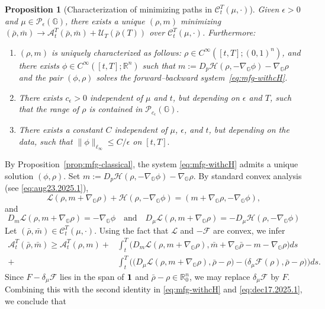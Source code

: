 \documentclass[10pt]{article}
\newtheorem{proposition}[theorem]{Proposition}
\numberwithin{equation}{section}
\newcommand{\cA}{ \mathcal{A}}
\newcommand{\cC}{ \mathcal{C}}
\newcommand{\cF}{ \mathcal{F}}
\newcommand{\cH}{ \mathcal{H}}
\newcommand{\cL}{ \mathcal{L}}
\newcommand{\cP}{ \mathcal{P}}
\newcommand{\cU}{ \mathcal{U}}
\newcommand{\bG}{\mathbb G}
\newcommand{\bR}{\mathbb R}
\newcommand{\R}{\mathbb R}
\def\R{{\mathbb{R}}}
\def\cH{\mathcal{H}}
\def\cL{\mathcal{L}}
\def\G{\mathbb{G}}
\begin{document}
%
%
\begin{proposition}[Characterization of minimizing paths in $\cC_t^T(\mu, \cdot)$]\label{prop:sufficient-min} Given $\epsilon>0$ and $\mu \in \cP_\epsilon(\G)$, there exists a unique $(\rho, m)$ minimizing $(\bar \rho, \bar m) \to \cA_t^T(\bar \rho, \bar m)+\cU_T(\bar \rho(T))$ over $\cC_t^T(\mu, \cdot)$. Furthermore:
\begin{enumerate}
\item[(i)] $(\rho, m)$ is uniquely characterized as follows: $\rho\in C^\infty([t,T];(0,1)^n)$, and there exists $\phi\in C^\infty([t,T];\R^n)$ such that $m:= D_p \cH(\rho, -\nabla_{\G}\phi)-\nabla_\bG \rho$ and the pair $(\phi,\rho)$ solves the forward--backward system~\eqref{eq:mfg-withcH}.
\item[(ii)] There exists $c_\epsilon>0$ independent of $\mu$ and $t$, but depending on $\epsilon$ and $T$, such that the range of $\rho$ is contained in $\cP_{c_\epsilon}(\G).$
\item[(iii)] There exists a constant $C$ independent of $\mu$, $\epsilon$, and $t$, but depending on the data, such that $\|\phi\|_{\ell_\infty} \leq C/\epsilon$ on $[t, T].$
\end{enumerate}
\end{proposition}
% 
\proof{} By Proposition~\ref{prop:mfg-classical}, the system \eqref{eq:mfg-withcH} admits a unique solution $(\phi, \rho)$. Set $m:= D_p \cH(\rho, -\nabla_{\G}\phi)-\nabla_\bG \rho$. By standard convex analysis (see \eqref{eq:aug23.2025.1}), 
\[
\cL(\rho, m+\nabla_\bG \rho)+\cH(\rho, -\nabla_{\G}\phi)=(m+\nabla_{\G}\rho, -\nabla_{\G}\phi),
\]
and 
\begin{equation}  \label{eq:dec17.2025.1}
 D_m \cL(\rho, m+\nabla_\bG \rho)=-\nabla_{\G}\phi \quad \text{and} \quad D_\mu  \cL(\rho, m+\nabla_\bG \rho)= - D_\mu \cH(\rho, -\nabla_{\G}\phi)
\end{equation}
Let $(\bar \rho, \bar m) \in \cC_t^T(\mu, \cdot).$ Using the fact that $\cL$ and $-\cF$ are convex, we infer 
 \begin{align*}
 \cA_t^T(\bar \rho,  \bar m)  \geq   \cA_t^T( \rho, m)
 +&\int_t^T \big( D_m \cL(\rho, m+\nabla_\bG \rho), \bar m+\nabla_\bG \bar \rho-m-\nabla_\bG \rho\big)ds\\
  +& \int_t^T \Big( \big( D_\mu  \cL(\rho, m+\nabla_\bG \rho), \bar \rho -\rho\big) - \big(\delta_\mu \cF(\rho), \bar \rho-\rho\big)\Big)ds.
 \end{align*}
Since $F-\delta_\mu \cF$ lies in the span of ${\bf 1}$ and $\bar \rho - \rho \in \bR^n_0$, we may replace $\delta_\mu \cF$ by $F$. Combining this with the second identity in \eqref{eq:mfg-withcH} and \eqref{eq:dec17.2025.1}, we conclude that  
\end{document}
